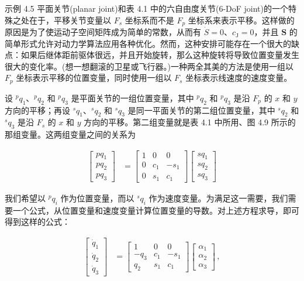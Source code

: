 \documentclass[10pt,a4paper]{book}
\theoremstyle{thmstyle} %
\theoremstyle{defstyle} %
\theoremstyle{prostyle} %
\begin{document}
示例 4.5 平面关节(planar joint)和表 4.1 中的六自由度关节(6-DoF joint)的一个特殊之处在于，平移关节变量以 $F_{s}$ 坐标系而不是 $F_{p}$ 坐标系来表示平移。这样做的原因是为了使运动子空间矩阵成为简单的常数，从而有 $\dot{S}=0$、$c_{\mathrm{J}}=0$，并且 $\mathbf{S}$ 的简单形式允许对动力学算法应用各种优化。然而，这种安排可能存在一个很大的缺点：如果后继体距前驱体很远，并且开始旋转，那么这种旋转将导致位置变量发生很大的变化率。(想一想翻滚的卫星或飞行器。)一种两全其美的方法是使用一组以 $F_{p}$ 坐标表示平移的位置变量，同时使用一组以 $F_{s}$ 坐标表示线速度的速度变量。



设 $^{p}q_{1}$、$^{p}q_{2}$ 和 $^{p}q_{3}$ 是平面关节的一组位置变量，其中 $^{p}q_{2}$ 和 $^{p}q_{3}$ 是沿 $F_{p}$ 的 $x$ 和 $y$ 方向的平移；再设 $^{s}q_{1}$、$^{s}q_{2}$ 和 $^{s}q_{3}$ 是同一平面关节的第二组位置变量，其中 $^{s}q_{2}$ 和 $^{s}q_{3}$ 是沿 $F_{s}$ 的 $x$ 和 $y$ 方向的平移。第二组变量就是表 4.1 中所用、图 4.9 所示的那组变量。这两组变量之间的关系为



$$
\begin{array}{rl} { \left[ \begin{array}{l} { p q_1} \\ { p q_2} \\ { p q_3} \end{array} \right] } & { = \left[ \begin{array}{lll} { 1} & { 0} & { 0} \\ { 0} & { c_1} & { - s_1} \\ { 0} & { s_1} & { c_1} \end{array} \right] \left[ \begin{array}{l} { s q_1} \\ { s q_2} \\ { s q_3} \end{array} \right]} \end{array}
$$



我们希望以 $^{p}q_{i}$ 作为位置变量，而以 $^{s}q_{i}$ 作为速度变量。为满足这一需要，我们需要一个公式，从位置变量和速度变量计算位置变量的导数。对上述方程求导，即可得到这样的公式：



$$
\begin{array}{rl} { \left[ \begin{array}{l} { \dot { q } _ { 1 } } \\{ \dot { q } _ { 2 } } \\{ \dot { q } _ { 3 } } \end{array} \right] } & { = \left[ \begin{array}{lll} { 1 } & { 0 } & { 0 } \\{ - q _ { 3 } } & { c _ { 1 } } & { - s _ { 1 } } \\{ q _ { 2 } } & { s _ { 1 } } & { c _ { 1 } } \end{array} \right] \left[ \begin{array}{l} { \alpha _ { 1 } } \\{ \alpha _ { 2 } } \\{ \alpha _ { 3 } } \end{array} \right] \, , } \end{array}
$$
\end{document}
